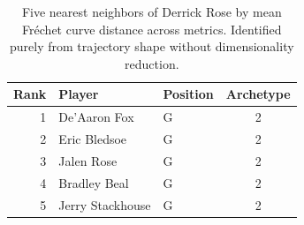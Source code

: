 \begin{table}[htbp]
  \centering\small
  \begin{tabular}{rllc}
    \toprule
    Rank & Player & Position & Archetype \\
    \midrule
    1 & De'Aaron Fox & G & 2 \\
    2 & Eric Bledsoe & G & 2 \\
    3 & Jalen Rose & G & 2 \\
    4 & Bradley Beal & G & 2 \\
    5 & Jerry Stackhouse & G & 2 \\
    \bottomrule
  \end{tabular}
  \caption{Five nearest neighbors of Derrick Rose by mean Fr\'{e}chet curve distance across metrics. Identified purely from trajectory shape without dimensionality reduction.}
  \label{tab:Derrick_Rose_frechet_curve_neighbors}
\end{table}

